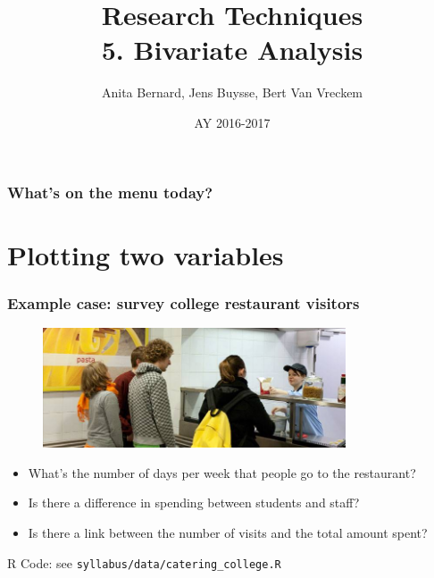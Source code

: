 \documentclass{beamer}
\title[Bivariate Analysis]{Research Techniques\\5. Bivariate Analysis}
\author{Anita Bernard, Jens Buysse, Bert {Van Vreckem}}
\date{AY 2016-2017}
\begin{document}

\HoGentLogo

\titleframe


\begin{frame}
  \frametitle{What's on the menu today?}

  \tableofcontents
\end{frame}

\section{Plotting two variables}
\sectionframelogo{}

\begin{frame}
  \frametitle{Example case: survey college restaurant visitors}

  \begin{figure}
    \centering
    \includegraphics[width=0.8\textwidth] {img/students.jpg}
    \label{fig:students}
  \end{figure}

  \begin{itemize}
    \item What's the number of days per week that people go to the restaurant?
    \item Is there a difference in spending between students and staff?
    \item Is there a link between the number of visits and the total amount spent?
  \end{itemize}

  R Code: see \texttt{syllabus/data/catering\_college.R}

\end{frame}
\end{document}
